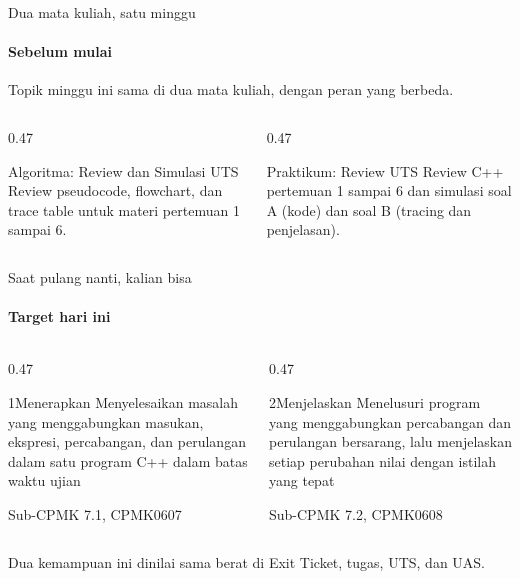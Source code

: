 \documentclass[t]{beamer}
\begin{document}

\begin{frame}{Dua mata kuliah, satu minggu}
\framesubtitle{Sebelum mulai}
Topik minggu ini sama di dua mata kuliah, dengan peran yang berbeda.
\vspace{10pt}

\begin{columns}[T]
\begin{column}{0.47\textwidth}
\begin{Blok}{Algoritma: Review dan Simulasi UTS}
Review pseudocode, flowchart, dan trace table untuk materi pertemuan 1 sampai 6.
\end{Blok}
\end{column}
\begin{column}{0.47\textwidth}
\begin{BlokGelap}{Praktikum: Review UTS}
Review C++ pertemuan 1 sampai 6 dan simulasi soal A (kode) dan soal B (tracing dan penjelasan).
\end{BlokGelap}
\end{column}
\end{columns}
\end{frame}

\begin{frame}{Saat pulang nanti, kalian bisa}
\framesubtitle{Target hari ini}
\begin{columns}[T]
\begin{column}{0.47\textwidth}
\begin{Langkah}{1}{Menerapkan}
Menyelesaikan masalah yang menggabungkan masukan, ekspresi, percabangan, dan perulangan dalam satu program C++ dalam batas waktu ujian

{\footnotesize\color{ITERAInkMuted}Sub-CPMK 7.1, CPMK0607}
\end{Langkah}
\end{column}
\begin{column}{0.47\textwidth}
\begin{Langkah}{2}{Menjelaskan}
Menelusuri program yang menggabungkan percabangan dan perulangan bersarang, lalu menjelaskan setiap perubahan nilai dengan istilah yang tepat

{\footnotesize\color{ITERAInkMuted}Sub-CPMK 7.2, CPMK0608}
\end{Langkah}
\end{column}
\end{columns}
\vspace{8pt}
\begin{Catatan}
Dua kemampuan ini dinilai sama berat di Exit Ticket, tugas, UTS, dan UAS.
\end{Catatan}
\end{frame}
\end{document}
